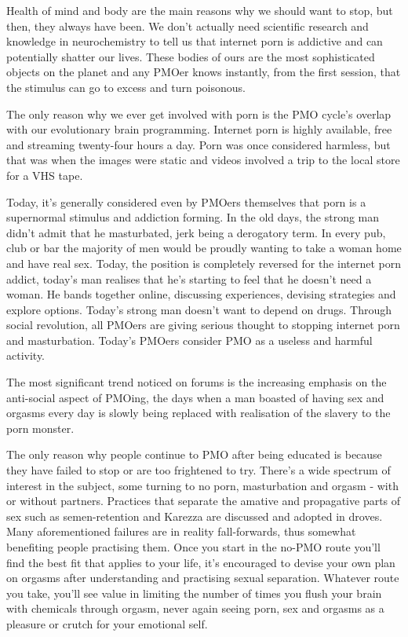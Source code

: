\documentclass[easypeasy.tex]{subfiles}
\begin{document}
Health of mind and body are the main reasons why we should want to stop, but then, they always have been. We don't actually need scientific research and knowledge in neurochemistry to tell us that internet porn is addictive and can potentially shatter our lives. These bodies of ours are the most sophisticated objects on the planet and any PMOer knows instantly, from the first session, that the stimulus can go to excess and turn poisonous.

The only reason why we ever get involved with porn is the PMO cycle's overlap with our evolutionary brain programming. Internet porn is highly available, free and streaming twenty-four hours a day. Porn was once considered harmless, but that was when the images were static and videos involved a trip to the local store for a VHS tape.

Today, it's generally considered even by PMOers themselves that porn is a supernormal stimulus and addiction forming. In the old days, the strong man didn't admit that he masturbated, jerk being a derogatory term. In every pub, club or bar the majority of men would be proudly wanting to take a woman home and have real sex. Today, the position is completely reversed for the internet porn addict, today's man realises that he's starting to feel that he doesn't need a woman. He bands together online, discussing experiences, devising strategies and explore options. Today's strong man doesn't want to depend on drugs. Through social revolution, all PMOers are giving serious thought to stopping internet porn and masturbation. Today's PMOers consider PMO as a useless and harmful activity.

The most significant trend noticed on forums is the increasing emphasis on the anti-social aspect of PMOing, the days when a man boasted of having sex and orgasms every day is slowly being replaced with realisation of the slavery to the porn monster.

The only reason why people continue to PMO after being educated is because they have failed to stop or are too frightened to try. There's a wide spectrum of interest in the subject, some turning to no porn, masturbation and orgasm - with or without partners. Practices that separate the amative and propagative parts of sex such as semen-retention and Karezza are discussed and adopted in droves. Many aforementioned failures are in reality fall-forwards, thus somewhat benefiting people practising them. Once you start in the no-PMO route you'll find the best fit that applies to your life, it's encouraged to devise your own plan on orgasms after understanding and practising sexual separation. Whatever route you take, you'll see value in limiting the number of times you flush your brain with chemicals through orgasm, never again seeing porn, sex and orgasms as a pleasure or crutch for your emotional self.
\end{document}
